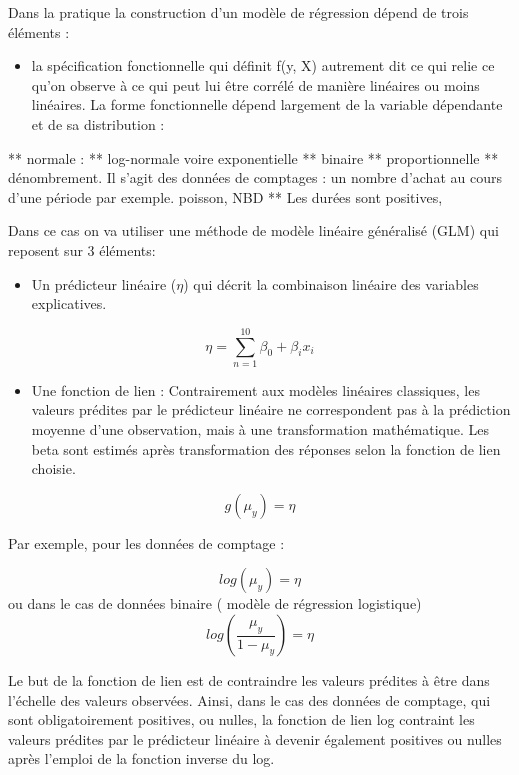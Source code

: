 \documentclass[
]{book}
\providecommand{\tightlist}{%
  \setlength{\itemsep}{0pt}\setlength{\parskip}{0pt}}
\begin{document}
Dans la pratique la construction d'un modèle de régression dépend de trois éléments :

\begin{itemize}
\tightlist
\item
  la spécification fonctionnelle qui définit f(y, X) autrement dit ce qui relie ce qu'on observe à ce qui peut lui être corrélé de manière linéaires ou moins linéaires. La forme fonctionnelle dépend largement de la variable dépendante et de sa distribution :
\end{itemize}

** normale :
** log-normale voire exponentielle
** binaire
** proportionnelle
** dénombrement. Il s'agit des données de comptages : un nombre d'achat au cours d'une période par exemple. poisson, NBD
** Les durées sont positives,

Dans ce cas on va utiliser une méthode de modèle linéaire généralisé (GLM) qui reposent sur 3 éléments:

\begin{itemize}
\tightlist
\item
  Un prédicteur linéaire (\(\eta\)) qui décrit la combinaison linéaire des variables explicatives.
\end{itemize}

\[\eta=\sum_{n=1}^{10}\beta_{0}+\beta_{i}x_{i}\]

\begin{itemize}
\tightlist
\item
  Une fonction de lien : Contrairement aux modèles linéaires classiques, les valeurs prédites par le prédicteur linéaire ne correspondent pas à la prédiction moyenne d'une observation, mais à une transformation mathématique. Les beta sont estimés après transformation des réponses selon la fonction de lien choisie.
\end{itemize}

\[g(\mu_{y})=\eta\]

Par exemple, pour les données de comptage :

\[log(\mu_{y})=\eta\]
ou dans le cas de données binaire ( modèle de régression logistique)
\[log(\frac{\mu_{y}}{1-\mu_{y}})=\eta\]

Le but de la fonction de lien est de contraindre les valeurs prédites à être dans l'échelle des valeurs observées. Ainsi, dans le cas des données de comptage, qui sont obligatoirement positives, ou nulles, la fonction de lien log contraint les valeurs prédites par le prédicteur linéaire à devenir également positives ou nulles après l'emploi de la fonction inverse du log.
\end{document}
